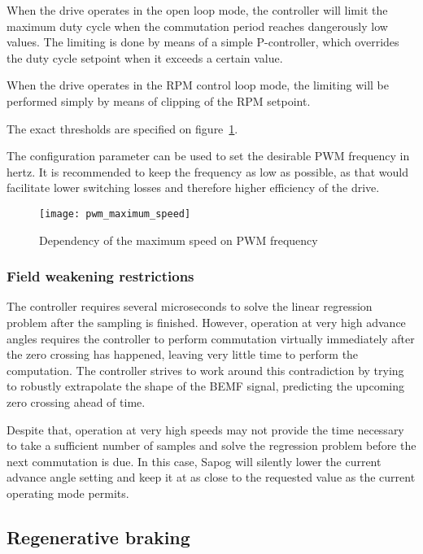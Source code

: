 \documentclass{zubaxdoc}
\begin{document}
	When the drive operates in the open loop mode, the controller will limit the maximum duty cycle
	when the commutation period reaches dangerously low values.
	The limiting is done by means of a simple P-controller,
	which overrides the duty cycle setpoint when it exceeds a certain value.
	
	When the drive operates in the RPM control loop mode, the limiting will be performed simply by means of
	clipping of the RPM setpoint.
	
	The exact thresholds are specified on figure~\ref{pwm_maximum_speed}.
	
	The configuration parameter  can be used to set the desirable PWM frequency
	in hertz.
	It is recommended to keep the frequency as low as possible,
	as that would facilitate lower switching losses and therefore higher efficiency of the drive.
	
	\begin{figure}[hbt]
		\centering
		\texttt{[image: pwm\_maximum\_speed]}
		\caption{Dependency of the maximum speed on PWM frequency
			\label{pwm_maximum_speed}}
	\end{figure}
	
	\subsubsection{Field weakening restrictions}
	
	The controller requires several microseconds to solve the linear regression problem after the sampling is
	finished.
	However, operation at very high advance angles requires the controller to perform commutation virtually
	immediately after the zero crossing has happened, leaving very little time to perform the computation.
	The controller strives to work around this contradiction by trying to robustly extrapolate the shape of the
	BEMF signal, predicting the upcoming zero crossing ahead of time.
	
	Despite that, operation at very high speeds may not provide the time necessary to take a sufficient
	number of samples and solve the regression problem before the next commutation is due.
	In this case, Sapog will silently lower the current advance angle setting and keep it at as close
	to the requested value as the current operating mode permits.
	
	\subsection{Regenerative braking}
	
\end{document}

